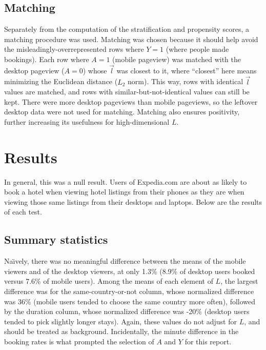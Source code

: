\documentclass{article}
\begin{document}
\subsection{Matching}

Separately from the computation of the stratification and propensity scores, a
matching procedure was used.  Matching was chosen because it should help avoid
the misleadingly-overrepresented rows where $Y=1$ (where people made bookings).
Each row where $A=1$ (mobile pageview) was matched with the desktop pageview
($A=0$) whose $\vec{l}$ was closest to it, where ``closest'' here means
minimizing the Euclidean distance ($L_2$ norm).  This way, rows with identical
$\vec{l}$ values are matched, and rows with similar-but-not-identical values can
still be kept.  There were more desktop pageviews than mobile pageviews, so the
leftover desktop data were not used for matching.  Matching also ensures
positivity, further increasing its usefulness for high-dimensional $L$.

\section{Results} %

In general, this was a null result.  Users of Expedia.com are about as likely to
book a hotel when viewing hotel listings from their phones as they are when
viewing those same listings from their desktops and laptops.  Below are the
results of each test.

\subsection{Summary statistics}

Na\"{\i}vely, there was no meaningful difference between the means of the mobile
viewers and of the desktop viewers, at only 1.3\% (8.9\% of desktop users booked
versus 7.6\% of mobile users).  Among the means of each element of $L$, the
largest difference was for the same-country-or-not column, whose normalized
difference was 36\% (mobile users tended to choose the same country more often),
followed by the duration column, whose normalized difference was -20\% (desktop
users tended to pick slightly longer stays).  Again, these values do not adjust
for $L$, and should be treated as background.  Incidentally, the minute
difference in the booking rates is what prompted the selection of $A$ and $Y$
for this report.
\end{document}
